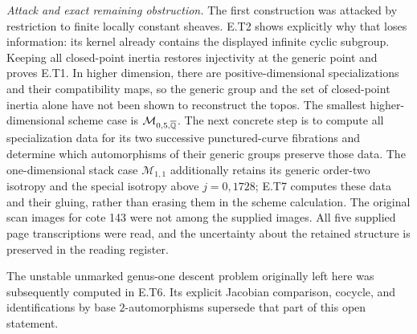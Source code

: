 \noindent\emph{Attack and exact remaining obstruction.}
The first construction was attacked by restriction to finite
locally constant sheaves.  E.T2 shows explicitly why that loses
information: its kernel already contains the displayed infinite
cyclic subgroup.  Keeping all closed-point inertia restores
injectivity at the generic point and proves E.T1.  In higher
dimension, there are positive-dimensional specializations and
their compatibility maps, so the generic group and the set of
closed-point inertia alone have not been shown to reconstruct
the topos.  The smallest higher-dimensional scheme case is
$\mathcal M_{0,5,\overline{\mathbb Q}}$.  The next concrete step is to
compute all specialization data for its two successive
punctured-curve fibrations and determine which automorphisms
of their generic groups preserve those data.  The
one-dimensional stack case $\mathcal M_{1,1}$ additionally
retains its generic order-two isotropy and the special
isotropy above $j=0,1728$; E.T7 computes these data and their
gluing, rather than erasing them in the scheme calculation.
The original scan images for cote 143 were not among the
supplied images.  All five supplied page transcriptions were
read, and the uncertainty about the retained structure is
preserved in the reading register.

The unstable unmarked genus-one descent problem originally
left here was subsequently computed in E.T6.  Its explicit
Jacobian comparison, cocycle, and identifications by base
$2$-automorphisms supersede that part of this open statement.
